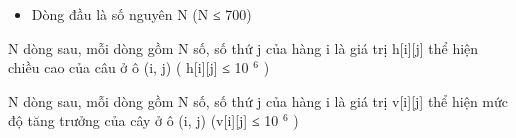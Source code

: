 \begin{itemize}
	\item     Dòng đầu là số nguyên N (N ≤ 700)   
\end{itemize}

   N dòng sau, mỗi dòng gồm N số, số thứ j của hàng i là giá trị h[i][j] thể hiện chiều cao của câu ở ô (i, j) ( h[i][j] ≤ 10   $^    6   $   )  

   N dòng sau, mỗi dòng gồm N số, số thứ j của hàng i là giá trị v[i][j] thể hiện mức độ tăng trưởng của cây ở ô (i, j) (v[i][j] ≤ 10   $^    6   $   )  

\